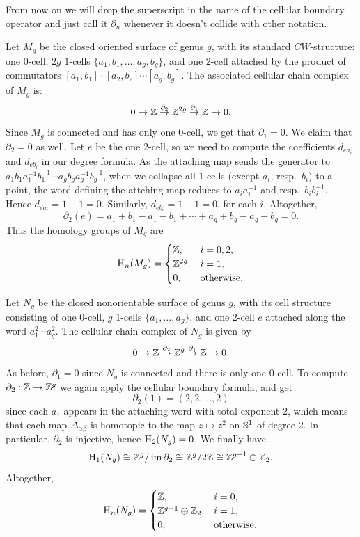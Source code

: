 From now on we will drop the superscript in the name of the cellular boundary operator and just call it $\partial_n$ whenever it doesn't collide with other notation.


\begin{example}
    Let $M_g$ be the closed oriented surface of genus $g$, with its standard $CW$-structure: one $0$-cell, $2g$ $1$-cells $\{a_1,b_1,\ldots,a_g,b_g\}$, and one $2$-cell attached by the product of commutators $[a_1,b_1]\cdot[a_2,b_2]\cdots [a_g,b_g]$. The associated cellular chain complex of $M_g$ is:
    \[0\to \mathbb{Z} \overset{\partial_2}{\to}\mathbb{Z}^{2g}\overset{\partial_1}{\to}\mathbb{Z} \to 0.\]
    Since $M_g$ is connected and has only one $0$-cell, we get that $\partial_1=0$. We claim that $\partial_2=0$ as well. Let $e$ be the one $2$-cell, so we need to compute the coefficients $d_{ea_i}$ and $d_{eb_i}$ in our degree formula. As the attaching map sends the generator to $a_1b_1a_1^{-1}b_1^{-1}\cdots a_gb_ga_g^{-1}b_g^{-1}$, when we collapse all $1$-cells (except $a_i$, resp.~$b_i$) to a point, the word defining the attching map reduces to $a_ia_i^{-1}$ and resp.~$b_ib_i^{-1}$. Hence $d_{ea_i}=1-1=0$. Similarly, $d_{eb_i}=1-1=0$, for each $i$. Altogether,
    \[\partial_2(e)=a_1+b_1-a_1-b_1+\cdots +a_g+b_g-a_g-b_g=0.\]
    Thus the homology groups of $M_g$ are
    \[\mathrm{H}_n(M_g)=\begin{cases}
        \mathbb{Z}, &i=0,2,\\
        \mathbb{Z}^{2g}.& i=1,\\
        0,&\text{otherwise}.
    \end{cases}\]
\end{example}

\begin{example}
    Let $N_g$ be the closed nonorientable surface of genus $g$, with its cell structure consisting of one $0$-cell, $g$ $1$-cells $\{a_1,\ldots,a_g\}$, and one $2$-cell $e$ attached along the word $a_1^2\cdots a_g^2$. The cellular chain complex of $N_g$ is given by
    \[0\to\mathbb{Z} \overset{\partial_2}{\to}\mathbb{Z}^g\overset{\partial_1}{\to}\mathbb{Z} \to 0.\]
    As before, $\partial_1=0$ since $N_g$ is connected and there is only one $0$-cell. To compute $\partial_2:\mathbb{Z}\to \mathbb{Z}^g$ we again apply the cellular boundary formula, and get 
    \[\partial_2(1)=(2,2,\ldots,2)\]
    since each $a_1$ appears in the attaching word with total exponent $2$, which means that each map $\Delta_{\alpha\beta}$ is homotopic to the map $z\mapsto z^2$ on $\mathbb{S}^1$ of degree $2$. In particular, $\partial_2$ is injective, hence $\mathrm{H}_2(N_g)=0$. We finally have
    \[\mathrm{H}_1(N_g)\cong \mathbb{Z}^g\slash\operatorname{im} \partial_2\cong \mathbb{Z}^g\slash 2\mathbb{Z}\cong \mathbb{Z}^{g-1}\oplus \mathbb{Z}_2.\]
    Altogether,
    \[\mathrm{H}_n(N_g)=\begin{cases}
        \mathbb{Z},&i=0,\\
        \mathbb{Z}^{g-1}\oplus\mathbb{Z}_2,&i=1,\\
        0,&\text{otherwise}.
    \end{cases}\]
\end{example}


